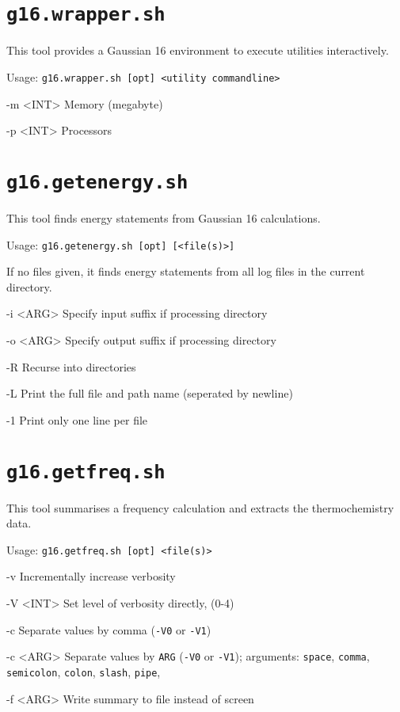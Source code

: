 \documentclass[final, a4paper, columns=3, margin=1.0cm, 10pt]{refcard}
\begin{document}
\section{\texttt{g16.wrapper.sh}}

This tool provides a Gaussian 16 environment to execute utilities interactively.

Usage: \texttt{g16.wrapper.sh [opt] <utility commandline>}

\begin{refcardlist}[labelfont=\ttfamily]
  \item[-m <INT>] Memory (megabyte)
  \item[-p <INT>] Processors
\end{refcardlist}


\section{\texttt{g16.getenergy.sh}}

This tool finds energy statements from Gaussian 16 calculations.

Usage: \texttt{g16.getenergy.sh [opt] [<file(s)>]}

If no files given, it finds energy statements from all log files in the current directory.

\begin{refcardlist}[labelfont=\ttfamily]
  \item[-i <ARG>] Specify input suffix if processing directory
  \item[-o <ARG>] Specify output suffix if processing directory
  \item[-R      ] Recurse into directories
  \item[-L      ] Print the full file and path name (seperated by newline)
  \item[-1      ] Print only one line per file
\end{refcardlist}

\section{\texttt{g16.getfreq.sh}}

This tool summarises a frequency calculation and extracts the thermochemistry data.

Usage: \texttt{g16.getfreq.sh [opt] <file(s)>}

\begin{refcardlist}[labelfont=\ttfamily]
  \item[-v      ] Incrementally increase verbosity
  \item[-V <INT>] Set level of verbosity directly, (0-4)
  \item[-c      ] Separate values by comma (\texttt{-V0} or \texttt{-V1})
  \item[-c <ARG>] Separate values by \texttt{ARG} (\texttt{-V0} or \texttt{-V1});
    arguments: \texttt{space}, \texttt{comma}, \texttt{semicolon}, \texttt{colon}, \texttt{slash}, \texttt{pipe}, 
  \item[-f <ARG>] Write summary to file instead of screen
\end{refcardlist}
\end{document}
